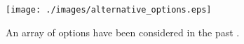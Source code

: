 \begin{figure}[htbp!]
  \begin{center}
    \texttt{[image: ./images/alternative\_options.eps]}
  \end{center}
  \caption{An array of options have been considered in the past 
    \cite{peters_whats_2013}.}
  \label{fig:alternative_options}
\end{figure}
